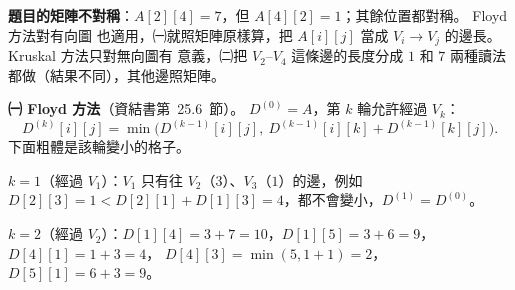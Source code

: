 \begin{pastsoln}
\textbf{題目的矩陣不對稱}：$A[2][4] = 7$，但 $A[4][2] = 1$；其餘位置都對稱。 Floyd 方法對有向圖
也適用，㈠就照矩陣原樣算，把 $A[i][j]$ 當成 $V_i \to V_j$ 的邊長。 Kruskal 方法只對無向圖有
意義，㈡把 $V_2$--$V_4$ 這條邊的長度分成 $1$ 和 $7$ 兩種讀法都做（結果不同），其他邊照矩陣。

\textbf{㈠ Floyd 方法}（資結書第~25.6~節）。 $D^{(0)} = A$，第 $k$ 輪允許經過 $V_k$：
\[
D^{(k)}[i][j] = \min\bigl(D^{(k-1)}[i][j],\ D^{(k-1)}[i][k] + D^{(k-1)}[k][j]\bigr).
\]
下面粗體是該輪變小的格子。

$k = 1$（經過 $V_1$）：$V_1$ 只有往 $V_2$（$3$）、$V_3$（$1$）的邊，例如
$D[2][3] = 1 < D[2][1] + D[1][3] = 4$，都不會變小，$D^{(1)} = D^{(0)}$。

$k = 2$（經過 $V_2$）：$D[1][4] = 3 + 7 = 10$，$D[1][5] = 3 + 6 = 9$，$D[4][1] = 1 + 3 = 4$，
$D[4][3] = \min(5, 1 + 1) = 2$，$D[5][1] = 6 + 3 = 9$。


\end{pastsoln}
